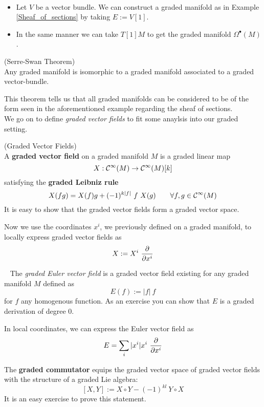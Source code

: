 \begin{example}~
\begin{itemize}
  \item Let $V$ be a vector bundle. We can construct a graded manifold as in Example \ref{Sheaf_of_sections} by taking $E:= V[1]$.

  \item In the same manner we can take $T[1]M$ to get the graded manifold $\Omega^\bullet(M)$.
\end{itemize}
\end{example}

\begin{theo} (Serre-Swan Theorem)\\
  Any graded manifold is isomorphic to a graded manifold associated to a graded vector-bundle.
\end{theo}

This theorem tells us that all graded manifolds can be considered to be of the form seen in the aforementioned example regarding the sheaf of sections.\\

We go on to define \emph{graded vector fields} to fit some anaylsis into our graded setting.

\begin{definition} (Graded Vector Fields)\\
  A \textbf{graded vector field} on a graded manifold $M$ is a graded linear map
  $$ X:\mathcal{C}^{\infty}(M) \rightarrow \mathcal{C}^{\infty}(M)[k] $$
  satisfying the \textbf{graded Leibniz rule}
  $$ X(fg) = X(f) g + (-1)^{k|f|} \ f \ X(g) \quad \quad \forall f,g \in \mathcal{C}^{\infty}(M)$$
  It is easy to show that the graded vector fields form a graded vector space.
\end{definition}

Now we use the coordinates $x^i$, we previously defined on a graded manifold, to locally express graded vector fields as
$$ X := X^i \ \dell{}{x^i} $$

\begin{example}~
  The \emph{graded Euler vector field} is a graded vector field existing for any graded manifold $M$ defined as
  $$ E(f) := |f| \ f $$
  for $f$ any homogenous function. As an exercise you can show that $E$ is a graded derivation of degree $0$.
\end{example}

In local coordinates, we can express the Euler vector field as
$$ E = \sum_i |x^i| x^i \ \frac{\partial }{\partial x^i} $$

\begin{rem}
  The \textbf{graded commutator} equips the graded vector space of graded vector fields with the structure of a graded Lie algebra:
  $$ [X,Y] := X \circ Y - (-1)^{kl} \ Y\circ X $$
  It is an easy exercise to prove this statement.
\end{rem}

